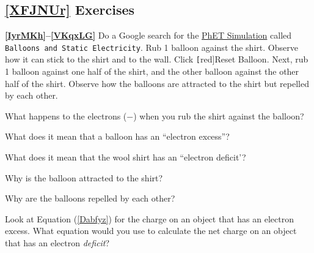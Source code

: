 \documentclass[main.tex]{subfiles}
\begin{document}
\begin{multicols}{2}

\subsection*{\ref{XFJNUr} Exercises}

\textbf{\ref{IyrMKh}--\ref{VKqxLG}} Do a Google search for the \href{https://phet.colorado.edu/en/simulations/balloons-and-static-electricity/about}{PhET Simulation} called \texttt{Balloons and Static Electricity}. Rub 1 balloon against the shirt. Observe how it can stick to the shirt and to the wall. Click \texttt[red]{Reset Balloon}.
Next, rub 1 balloon against one half of the shirt, and the other balloon against the other half of the shirt. Observe how the balloons are attracted to the shirt but repelled by each other.

\begin{exercise} \label{IyrMKh}
    What happens to the electrons ($-$) when you rub the shirt against the balloon?
\end{exercise}




\begin{exercise}
    What does it mean that a balloon has an ``electron excess''?
\end{exercise}

\begin{exercise}
    What does it mean that the wool shirt has an ``electron deficit'?
\end{exercise}

\begin{exercise}
    Why is the balloon attracted to the shirt?
\end{exercise}

\begin{exercise} \label{VKqxLG}
    Why are the balloons repelled by each other?
\end{exercise}

\cyanhrule

\begin{exercise} \label{9U7zJj}
    Look at Equation (\ref{Dabfyz}) for the charge on an object that has an electron excess. What equation would you use to calculate the net charge on an object that has an electron \textit{deficit}?
\end{exercise}


\end{multicols}
\end{document}
